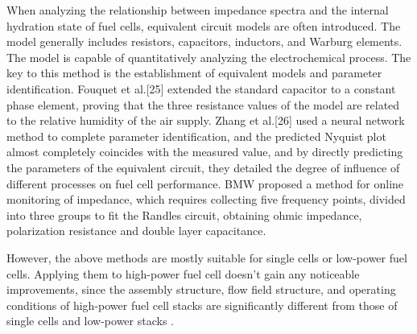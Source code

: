 \par
When analyzing the relationship between impedance spectra and the internal hydration state of fuel cells, equivalent circuit models are often introduced. The model generally includes resistors, capacitors, inductors, and Warburg elements\cite{tangRecentProgressUse2020}. The model is capable of quantitatively analyzing the electrochemical process.  The key to this method is the establishment of equivalent models and parameter identification. Fouquet et al.[25] extended the standard capacitor to a constant phase element, proving that the three resistance values of the model are related to the relative humidity of the air supply. Zhang et al.[26] used a neural network method to complete parameter identification, and the predicted Nyquist plot almost completely coincides with the measured value, and by directly predicting the parameters of the equivalent circuit, they detailed the degree of influence of different processes on fuel cell performance. BMW proposed a method for online monitoring of impedance, which requires collecting five frequency points, divided into three groups to fit the Randles circuit, obtaining ohmic impedance, polarization resistance and double layer capacitance\cite{fouquetModelBasedPEM2006}.
\par
However, the above methods are mostly suitable for single cells or low-power fuel cells. Applying them to high-power fuel cell doesn't gain any noticeable improvements\cite{tangRecentProgressUse2020,jiangMicrobialFuelCell2018,dotelliCombiningElectricalPressure2016,millerReviewPolymerElectrolyte2011,nagulapatiMachineLearningBased2023}, since the assembly structure, flow field structure, and operating conditions of high-power fuel cell stacks are significantly different from those of single cells and low-power stacks \cite{verhaertWaterManagementAlkaline2011}.
